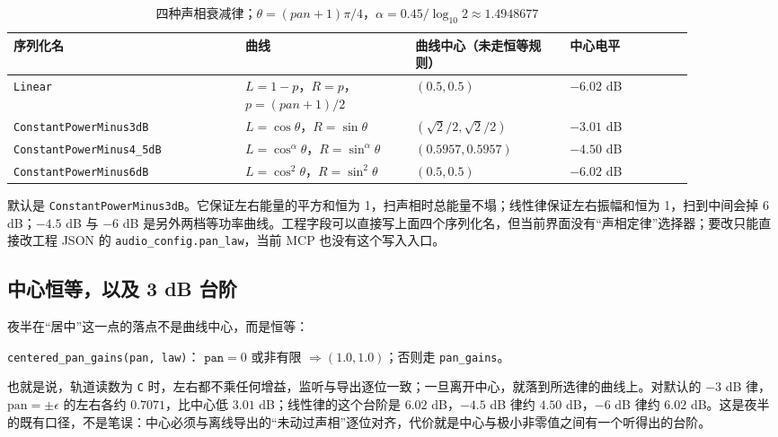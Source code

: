 \begin{table}[htbp]
\centering
\small
\begin{tabular}{@{}p{0.30\linewidth}p{0.22\linewidth}p{0.20\linewidth}p{0.16\linewidth}@{}}
\hline
序列化名 & 曲线 & 曲线中心（未走恒等规则） & 中心电平 \\
\hline
\texttt{Linear} & $L=1-p$，$R=p$，$p=(pan+1)/2$ & $(0.5,0.5)$ & $-6.02$ dB \\
\texttt{ConstantPower\allowbreak Minus3dB} & $L=\cos\theta$，$R=\sin\theta$ & $(\sqrt2/2,\sqrt2/2)$ & $-3.01$ dB \\
\texttt{ConstantPower\allowbreak Minus4\_5dB} & $L=\cos^{\alpha}\theta$，$R=\sin^{\alpha}\theta$ & $(0.5957,0.5957)$ & $-4.50$ dB \\
\texttt{ConstantPower\allowbreak Minus6dB} & $L=\cos^2\theta$，$R=\sin^2\theta$ & $(0.5,0.5)$ & $-6.02$ dB \\
\hline
\end{tabular}
\caption{四种声相衰减律；$\theta=(pan+1)\pi/4$，$\alpha=0.45/\log_{10}2\approx1.4948677$}
\label{tab:pan-laws}
\end{table}

默认是 \texttt{ConstantPower\allowbreak Minus3dB}。它保证左右能量的平方和恒为 1，扫声相时总能量不塌；线性律保证左右振幅和恒为 1，扫到中间会掉 6 dB；$-4.5$ dB 与 $-6$ dB 是另外两档等功率曲线。工程字段可以直接写上面四个序列化名，但当前界面没有“声相定律”选择器；要改只能直接改工程 JSON 的 \texttt{audio\_config.pan\_law}，当前 MCP 也没有这个写入入口。

\subsection{中心恒等，以及 3 dB 台阶}

夜半在“居中”这一点的落点不是曲线中心，而是恒等：

\begin{center}
\texttt{centered\_pan\_gains(pan, law)}：\quad
$\texttt{pan}=0$ 或非有限 $\Rightarrow (1.0,1.0)$；否则走 \texttt{pan\_gains}。
\end{center}

也就是说，轨道读数为 \texttt{C} 时，左右都不乘任何增益，监听与导出逐位一致；一旦离开中心，就落到所选律的曲线上。对默认的 $-3$ dB 律，$\mathrm{pan}=\pm\epsilon$ 的左右各约 $0.7071$，比中心低 $3.01$ dB；线性律的这个台阶是 $6.02$ dB，$-4.5$ dB 律约 $4.50$ dB，$-6$ dB 律约 $6.02$ dB。这是夜半的既有口径，不是笔误：中心必须与离线导出的“未动过声相”逐位对齐，代价就是中心与极小非零值之间有一个听得出的台阶。

